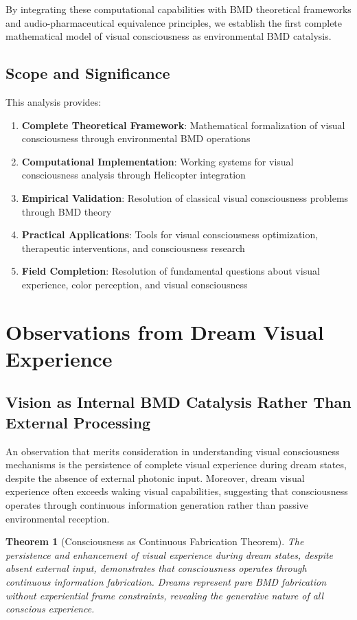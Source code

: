 \documentclass[12pt,a4paper]{article}
\newtheorem{theorem}{Theorem}[section]
\begin{document}
By integrating these computational capabilities with BMD theoretical frameworks and audio-pharmaceutical equivalence principles, we establish the first complete mathematical model of visual consciousness as environmental BMD catalysis.

\subsection{Scope and Significance}

This analysis provides:

\begin{enumerate}
\item \textbf{Complete Theoretical Framework}: Mathematical formalization of visual consciousness through environmental BMD operations
\item \textbf{Computational Implementation}: Working systems for visual consciousness analysis through Helicopter integration
\item \textbf{Empirical Validation}: Resolution of classical visual consciousness problems through BMD theory
\item \textbf{Practical Applications}: Tools for visual consciousness optimization, therapeutic interventions, and consciousness research
\item \textbf{Field Completion}: Resolution of fundamental questions about visual experience, color perception, and visual consciousness
\end{enumerate}

\section{Observations from Dream Visual Experience}

\subsection{Vision as Internal BMD Catalysis Rather Than External Processing}

An observation that merits consideration in understanding visual consciousness mechanisms is the persistence of complete visual experience during dream states, despite the absence of external photonic input. Moreover, dream visual experience often exceeds waking visual capabilities, suggesting that consciousness operates through continuous information generation rather than passive environmental reception.

\begin{theorem}[Consciousness as Continuous Fabrication Theorem]
The persistence and enhancement of visual experience during dream states, despite absent external input, demonstrates that consciousness operates through continuous information fabrication. Dreams represent pure BMD fabrication without experiential frame constraints, revealing the generative nature of all conscious experience.
\end{theorem}
\end{document}

